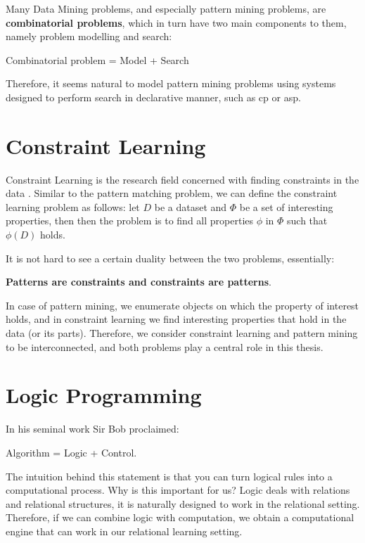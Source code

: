 Many Data Mining problems, and especially pattern mining
problems, are \textbf{combinatorial problems}, which in turn have two main components to them, namely problem modelling and search: 

\begin{center}
  Combinatorial problem = Model + Search
\end{center}

Therefore, it seems natural to model pattern mining problems 
using systems designed to perform search in declarative manner, such as \acrlong{cp} or \acrlong{asp}. %




\section{Constraint Learning}
Constraint Learning is the research field concerned with finding
constraints in the data \parencite{constraint_learning,QUACQ,Conacq}.
Similar to the pattern matching problem, we can define 
the constraint learning problem as follows:
let $D$ be a dataset and $\Phi$ be a set of interesting properties, then
then the problem is to find all properties $\phi$ in $\Phi$ such that $\phi(D)$ holds.

It is not hard to see a certain duality between the two problems, essentially:
\begin{center}
  \textbf{Patterns are constraints and constraints are patterns}.
\end{center}

In case of pattern mining, we enumerate objects on which the property
of interest holds, and in constraint learning we find interesting
properties that hold in the data (or its parts).
Therefore, we consider constraint learning and pattern mining to be interconnected, and both problems play a central role in this thesis.

\section{Logic Programming}
In his seminal work Sir Bob \textcite{kowalski} proclaimed:
\begin{center}
  Algorithm = Logic + Control.
\end{center}

The intuition behind this statement is that
you can turn logical rules into a computational process. 
Why is this important for us? Logic deals with
relations and relational structures, it is naturally designed to
work in the relational setting. Therefore, if we can combine logic
with computation, we obtain a computational engine that can work in
our relational learning setting.

